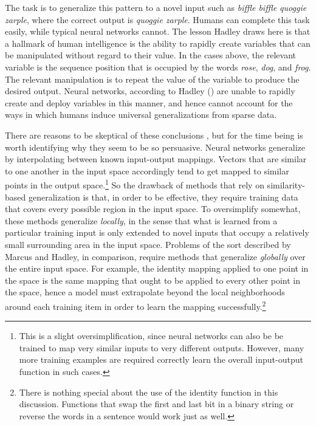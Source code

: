 \noindent
The task is to generalize this pattern to a novel input such as \textit{biffle biffle quoggie zarple}, where the correct output is \textit{quoggie zarple}. Humans can complete this task easily, while typical neural networks cannot. The lesson Hadley draws here is that a hallmark of human intelligence is the ability to rapidly create variables that can be manipulated without regard to their value. In the cases above, the relevant variable is the sequence position that is occupied by the words \textit{rose}, \textit{dog}, and \textit{frog}. The relevant manipulation is to repeat the value of the variable to produce the desired output. Neural networks, according to Hadley (\citeyear{Hadley:2009}) are unable to rapidly create and deploy variables in this manner, and hence cannot account for the ways in which humans induce universal generalizations from sparse data.

There are reasons to be skeptical of these conclusions \citep[see e.g.][pp. 269-72]{Eliasmith:2013}, but for the time being is worth identifying why they seem to be so persuasive. Neural networks generalize by interpolating between known input-output mappings. Vectors that are similar to one another in the input space accordingly tend to get mapped to similar points in the output space.\footnote{This is a slight oversimplification, since neural networks can also be be trained to map very similar inputs to very different outputs. However, many more training examples are required correctly learn the overall input-output function in such cases.} So the drawback of methods that rely on similarity-based generalization is that, in order to be effective, they require training data that covers every possible region in the input space. To oversimplify somewhat, these methods generalize \textit{locally}, in the sense that what is learned from a particular training input is only extended to novel inputs that occupy a relatively small surrounding area in the input space. Problems of the sort described by Marcus and Hadley, in comparison, require methods that generalize \textit{globally} over the entire input space. For example, the identity mapping applied to one point in the space is the same mapping that ought to be applied to every other point in the space, hence a model must extrapolate beyond the local neighborhoods around each training item in order to learn the mapping successfully.\footnote{There is nothing special about the use of the identity function in this discussion. Functions that swap the first and last bit in a binary string or reverse the words in a sentence would work just as well.}

